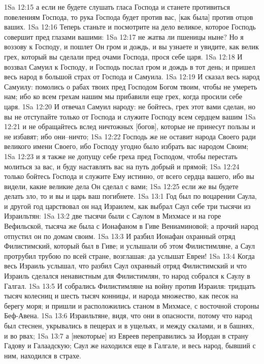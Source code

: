 1Sa 12:15  а если не будете слушать гласа Господа и станете противиться повелениям Господа, то рука Господа будет против вас, [как была] против отцов ваших.
1Sa 12:16  Теперь станьте и посмотрите на дело великое, которое Господь совершит пред глазами вашими:
1Sa 12:17  не жатва ли пшеницы ныне? Но я воззову к Господу, и пошлет Он гром и дождь, и вы узнаете и увидите, как велик грех, который вы сделали пред очами Господа, прося себе царя.
1Sa 12:18  И воззвал Самуил к Господу, и Господь послал гром и дождь в тот день; и пришел весь народ в большой страх от Господа и Самуила.
1Sa 12:19  И сказал весь народ Самуилу: помолись о рабах твоих пред Господом Богом твоим, чтобы не умереть нам; ибо ко всем грехам нашим мы прибавили еще грех, когда просили себе царя.
1Sa 12:20  И отвечал Самуил народу: не бойтесь, грех этот вами сделан, но вы не отступайте только от Господа и служите Господу всем сердцем вашим
1Sa 12:21  и не обращайтесь вслед ничтожных [богов], которые не принесут пользы и не избавят; ибо они--ничто;
1Sa 12:22  Господь же не оставит народа Своего ради великого имени Своего, ибо Господу угодно было избрать вас народом Своим;
1Sa 12:23  и я также не допущу себе греха пред Господом, чтобы перестать молиться за вас, и буду наставлять вас на путь добрый и прямой;
1Sa 12:24  только бойтесь Господа и служите Ему истинно, от всего сердца вашего, ибо вы видели, какие великие дела Он сделал с вами;
1Sa 12:25  если же вы будете делать зло, то и вы и царь ваш погибнете.
1Sa 13:1  Год был по воцарении Саула, и другой год царствовал он над Израилем, как выбрал Саул себе три тысячи из Израильтян:
1Sa 13:2  две тысячи были с Саулом в Михмасе и на горе Вефильской, тысяча же была с Ионафаном в Гиве Вениаминовой; а прочий народ отпустил он по домам своим.
1Sa 13:3  И разбил Ионафан охранный отряд Филистимский, который был в Гиве; и услышали об этом Филистимляне, а Саул протрубил трубою по всей стране, возглашая: да услышат Евреи!
1Sa 13:4  Когда весь Израиль услышал, что разбил Саул охранный отряд Филистимский и что Израиль сделался ненавистным для Филистимлян, то народ собрался к Саулу в Галгал.
1Sa 13:5  И собрались Филистимляне на войну против Израиля: тридцать тысяч колесниц и шесть тысяч конницы, и народа множество, как песок на берегу моря; и пришли и расположились станом в Михмасе, с восточной стороны Беф-Авена.
1Sa 13:6  Израильтяне, видя, что они в опасности, потому что народ был стеснен, укрывались в пещерах и в ущельях, и между скалами, и в башнях, и во рвах;
1Sa 13:7  а [некоторые] из Евреев переправились за Иордан в страну Гадову и Галаадскую; Саул же находился еще в Галгале, и весь народ, бывший с ним, находился в страхе.
